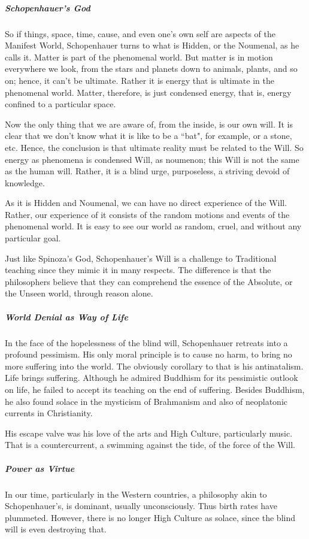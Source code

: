 \subparagraph{Schopenhauer's God}
So if things, space, time, cause, and even one's own self are aspects of the Manifest World, Schopenhauer turns to what is Hidden, or the Noumenal, as he calls it. Matter is part of the phenomenal world. But matter is in motion everywhere we look, from the stars and planets down to animals, plants, and so on; hence, it can't be ultimate. Rather it is energy that is ultimate in the phenomenal world. Matter, therefore, is just condensed energy, that is, energy confined to a particular space.

Now the only thing that we are aware of, from the inside, is our own will. It is clear that we don't know what it is like to be a ``bat", for example, or a stone, etc. Hence, the conclusion is that ultimate reality must be related to the Will. So energy as phenomena is condensed Will, as noumenon; this Will is not the same as the human will. Rather, it is a blind urge, purposeless, a striving devoid of knowledge.

As it is Hidden and Noumenal, we can have no direct experience of the Will. Rather, our experience of it consists of the random motions and events of the phenomenal world. It is easy to see our world as random, cruel, and without any particular goal.

Just like Spinoza's God, Schopenhauer's Will is a challenge to Traditional teaching since they mimic it in many respects. The difference is that the philosophers believe that they can comprehend the essence of the Absolute, or the Unseen world, through reason alone.

\subparagraph{World Denial as Way of Life}
In the face of the hopelessness of the blind will, Schopenhauer retreats into a profound pessimism. His only moral principle is to cause no harm, to bring no more suffering into the world. The obviously corollary to that is his antinatalism. Life brings suffering. Although he admired Buddhism for its pessimistic outlook on life, he failed to accept its teaching on the end of suffering. Besides Buddhism, he also found solace in the mysticism of Brahmanism and also of neoplatonic currents in Christianity.

His escape valve was his love of the arts and High Culture, particularly music. That is a countercurrent, a swimming against the tide, of the force of the Will.

\subparagraph{Power as Virtue}
In our time, particularly in the Western countries, a philosophy akin to Schopenhauer's, is dominant, usually unconsciously. Thus birth rates have plummeted. However, there is no longer High Culture as solace, since the blind will is even destroying that.

